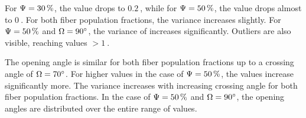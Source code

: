 For $\textnormal{$\Psi$} = \SI{30}{\percent}$, the \trel{} value drops to $\SI{0.2}{}$, while for $\textnormal{$\Psi$} = \SI{50}{\percent}$, the \trel{} value drops almost to $\SI{0}{}$.
For both fiber population fractions, the variance increases slightly.
For $\textnormal{$\Psi$} = \SI{50}{\percent}$ and $\textnormal{$\Omega$} = \SI{90}{\degree}$, the variance of \trel{} increases significantly.
Outliers are also visible, reaching \trel{} values $>\SI{1}{}$.
\par
The opening angle \openingAngle{} is similar for both fiber population fractions up to a crossing angle of $\textnormal{$\Omega$}=\SI{70}{\degree}$.
For higher values in the case of $\textnormal{$\Psi$} = \SI{50}{\percent}$, the values increase significantly more.
The variance increases with increasing crossing angle for both fiber population fractions.
In the case of $\textnormal{$\Psi$} = \SI{50}{\percent}$ and $\textnormal{$\Omega$} = \SI{90}{\degree}$, the opening angles are distributed over the entire range of values.
% 
% 
%
